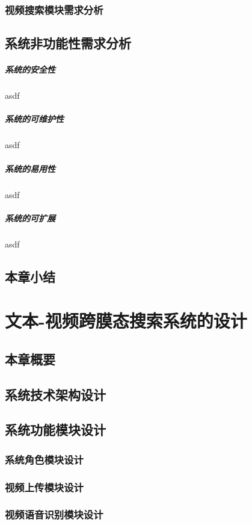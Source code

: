 \documentclass[12pt,a4paper,fancyhdr,openany,oneside]{ctexbook}
\begin{document}
\subsection{视频搜索模块需求分析}


\section{系统非功能性需求分析}
\paragraph{系统的安全性}asdf
\paragraph{系统的可维护性}asdf
\paragraph{系统的易用性}asdf
\paragraph{系统的可扩展}asdf
\section{本章小结}
% 
\chapter{文本-视频跨膜态搜索系统的设计}
\section{本章概要}
\section{系统技术架构设计}
\section{系统功能模块设计}
\subsection{系统角色模块设计}
\subsection{视频上传模块设计}
\subsection{视频语音识别模块设计}
\end{document}
